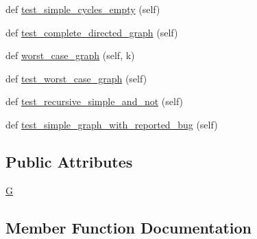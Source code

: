 \begin{DoxyCompactItemize}
\item 
def \hyperlink{classnetworkx_1_1algorithms_1_1tests_1_1test__cycles_1_1TestCycles_a0bfafcfa6af9799c3e6ebf5d5a589914}{test\+\_\+simple\+\_\+cycles\+\_\+empty} (self)
\item 
def \hyperlink{classnetworkx_1_1algorithms_1_1tests_1_1test__cycles_1_1TestCycles_a401af379a3b07dd1185f096645c66fb0}{test\+\_\+complete\+\_\+directed\+\_\+graph} (self)
\item 
def \hyperlink{classnetworkx_1_1algorithms_1_1tests_1_1test__cycles_1_1TestCycles_ae6f37d6157d2a09352b026aa2f988a91}{worst\+\_\+case\+\_\+graph} (self, k)
\item 
def \hyperlink{classnetworkx_1_1algorithms_1_1tests_1_1test__cycles_1_1TestCycles_a351d6f1f71c64b7f5785e75a1a235577}{test\+\_\+worst\+\_\+case\+\_\+graph} (self)
\item 
def \hyperlink{classnetworkx_1_1algorithms_1_1tests_1_1test__cycles_1_1TestCycles_a1fd0d1c0fe7dd92230315e7a10557be3}{test\+\_\+recursive\+\_\+simple\+\_\+and\+\_\+not} (self)
\item 
def \hyperlink{classnetworkx_1_1algorithms_1_1tests_1_1test__cycles_1_1TestCycles_aa790366ddd7ff2545f1484d66202b532}{test\+\_\+simple\+\_\+graph\+\_\+with\+\_\+reported\+\_\+bug} (self)
\end{DoxyCompactItemize}
\subsection*{Public Attributes}
\begin{DoxyCompactItemize}
\item 
\hyperlink{classnetworkx_1_1algorithms_1_1tests_1_1test__cycles_1_1TestCycles_a8c889ce0d4f4fafd728072f10b9d1299}{G}
\end{DoxyCompactItemize}


\subsection{Member Function Documentation}
\mbox{\label{classnetworkx_1_1algorithms_1_1tests_1_1test__cycles_1_1TestCycles_afae739b6f426c027af5df9f219f6ea3e}} 
